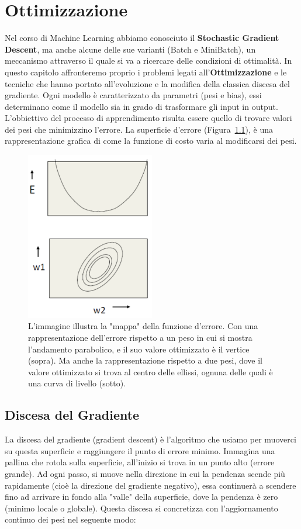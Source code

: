 \chapter{Ottimizzazione}
Nel corso di Machine Learning abbiamo conosciuto il \textbf{Stochastic Gradient Descent}, ma anche alcune delle sue varianti (Batch e MiniBatch), un meccanismo attraverso il quale si va a ricercare delle condizioni di ottimalità. In questo capitolo affronteremo proprio i problemi legati all'\textbf{Ottimizzazione} e le tecniche che hanno portato all'evoluzione e la modifica della classica discesa del gradiente. Ogni modello è caratterizzato da parametri (pesi e bias), essi determinano come il modello sia in grado di trasformare gli input in output. L'obbiettivo del processo di apprendimento risulta essere quello di trovare valori dei pesi che minimizzino l'errore. La superficie d'errore (Figura~\ref{fig:error_surface}), è una rappresentazione grafica di come la funzione di costo varia al modificarsi dei pesi.

\begin{figure}[h]
\centering
\includegraphics[width=0.5\textwidth]{figure/error_surface.png}
\caption{L’immagine illustra la "mappa" della funzione d’errore. Con una rappresentazione dell'errore rispetto a un peso in cui si mostra l'andamento parabolico, e il suo valore ottimizzato è il vertice (sopra). Ma anche la rappresentazione rispetto a due pesi, dove il valore ottimizzato si trova al centro delle ellissi, ognuna delle quali è una curva di livello (sotto).}
\label{fig:error_surface}
\end{figure}

\section{Discesa del Gradiente}
La discesa del gradiente (gradient descent) è l’algoritmo che usiamo per muoverci su questa superficie e raggiungere il punto di errore minimo. Immagina una pallina che rotola sulla superficie, all’inizio si trova in un punto alto (errore grande). Ad ogni passo, si muove nella direzione in cui la pendenza scende più rapidamente (cioè la direzione del gradiente negativo), essa continuerà a scendere fino ad arrivare in fondo alla "valle" della superficie, dove la pendenza è zero (minimo locale o globale). Questa discesa si concretizza con l'aggiornamento continuo dei pesi nel seguente modo:

